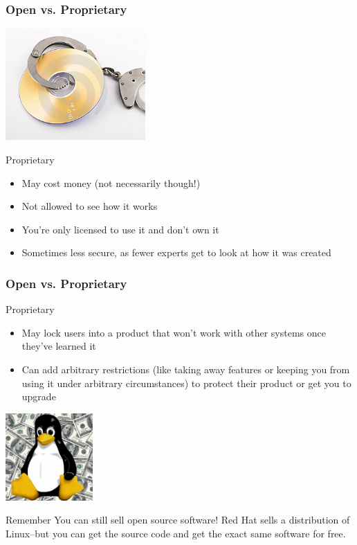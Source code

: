 \documentclass{beamer}
\begin{document}
\begin{frame}
  \frametitle{Open vs. Proprietary}
  \begin{center}\includegraphics[width=0.4\textwidth]{img/proprietary}\end{center}  \begin{Large} Proprietary \end{Large}
  \begin{itemize}
  \item May cost \textcolor{beamer@mygreen}{money} (not necessarily though!)
  \item \textcolor{beamer@mygreen}{Not} allowed to see how it works
  \item You're only \textcolor{beamer@mygreen}{licensed} to use it and don't own it
  \item Sometimes less \textcolor{beamer@mygreen}{secure}, as fewer experts get to look at how it was created

  \end{itemize}

\end{frame}

\begin{frame}
  \frametitle{Open vs. Proprietary}
  \begin{Large} Proprietary \end{Large}
  \begin{itemize}
  \item May \textcolor{beamer@mygreen}{lock} users into a product that won't work with other systems once they've learned it
  \item Can add arbitrary \textcolor{beamer@mygreen}{restrictions} (like taking away features or keeping you from using it under arbitrary circumstances) to protect their product or get you to upgrade
  \end{itemize}

  \begin{center}\includegraphics[width=0.25\textwidth]{img/tuxmoney}\end{center}
  \begin{block}{Remember}
    You can still sell open source software! Red Hat sells a distribution of Linux--but you can get the source code and get the exact same software for free.
  \end{block}
\end{frame}
\end{document}
